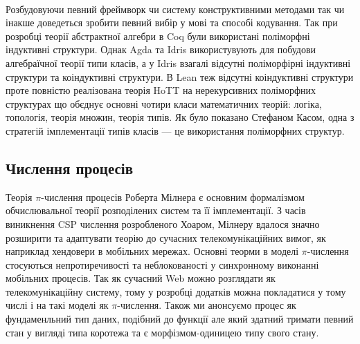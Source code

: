     \paragraph{}
    Розбудовуючи певний фреймворк чи систему конструктивними методами
    так чи інакше доведеться зробити певний вибір у мові та способі кодування.
    Так при розробці теорії абстрактної алгебри в Coq були використані
    поліморфні індуктивні структури. Однак Agda та Idris використувують
    для побудови алгебраїчної теорії типи класів, а у Idris взагалі відсутні
    поліморфірні індуктивні структури та коіндуктивні структури. В Lean
    теж відсутні коіндуктивні структури проте повністю реалізована теорія
    HoTT на нерекурсивних поліморфних структурах що обєднує основні чотири
    класи математичних теорій: логіка, топологія, теорія множин, теорія типів.
    Як було показано Стефаном Касом, одна з стратегій імплементації типів
    класів --- це використання поліморфних структур.

\newpage
    \subsection{Числення процесів}
    Теорія $\pi$-числення процесів Роберта Мілнера є основним формалізмом обчислювальної
    теорії розподілених систем та її імплементації. З часів виникнення CSP числення розробленого Хоаром,
    Мілнеру вдалося значно розширити та адаптувати теорію до сучасних
    телекомунікаційних вимог, як наприклад хендовери в мобільних мережах.
    Основні теорми в моделі $\pi$-числення стосуються непротиречивості та неблокованості
    у синхронному виконанні мобільних процесів. Так як сучасний Web можно розглядати
    як телекомунікаційну систему, тому у розробці додатків можна покладатися у тому
    числі і на такі моделі як $\pi$-числення.
    Також ми анонсуємо процес як фундаменльний тип даних, подібний до функції але який здатний
    тримати певний стан у вигляді типа коротежа та є морфізмом-одиницею типу свого стану.

\begin{prooftree}
\end{prooftree}

\begin{prooftree}
\end{prooftree}


